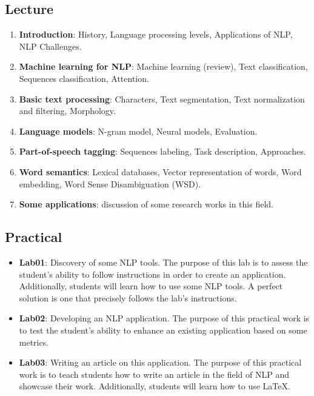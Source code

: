 \documentclass[11pt, a4paper]{article}
\begin{document}
\subsection{Lecture}

\begin{enumerate}
	\item \textbf{Introduction}: History, Language processing levels, Applications of NLP, NLP Challenges.
	\item \textbf{Machine learning for NLP}: Machine learning (review), Text classification, Sequences classification, Attention.
	\item \textbf{Basic text processing}: Characters, Text segmentation, Text normalization and filtering, Morphology.
	\item \textbf{Language models}: N-gram model, Neural models, Evaluation.
	\item \textbf{Part-of-speech tagging}: Sequences labeling, Task description, Approaches.
	\item \textbf{Word semantics}: Lexical databases, Vector representation of words, Word embedding, Word Sense Disambiguation (WSD).
	\item \textbf{Some applications}: discussion of some research works in this field.
\end{enumerate}

\subsection{Practical}

\begin{itemize}
	\item \textbf{Lab01}: Discovery of some NLP tools.
	The purpose of this lab is to assess the student's ability to follow instructions in order to create an application. Additionally, students will learn how to use some NLP tools.
	A perfect solution is one that precisely follows the lab's instructions.
	\item \textbf{Lab02}: Developing an NLP application.
	The purpose of this practical work is to test the student's ability to enhance an existing application based on some metrics.
	\item \textbf{Lab03}: Writing an article on this application.
	The purpose of this practical work is to teach students how to write an article in the field of NLP and showcase their work. 
	Additionally, students will learn how to use \LaTeX.
\end{itemize}
\end{document}
